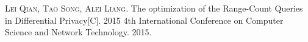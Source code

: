 
\begin{publications}{99}
    \item\textsc{Lei Qian, Tao Song, Alei Liang}. {The optimization of the Range-Count Queries in Differential Privacy}[C]. 2015 4th International Conference on Computer Science and Network Technology. 2015.
  
\end{publications}

